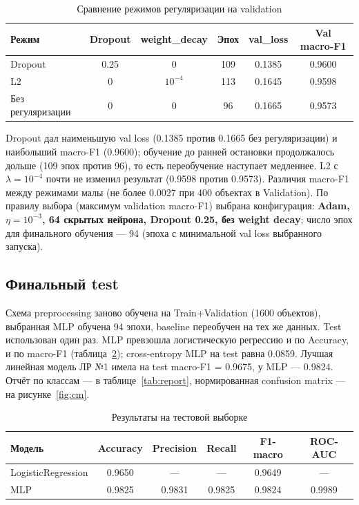 \documentclass[oneside,a4paper,14pt]{extarticle}
\begin{document}
\begin{table}[ht]
\centering
\small
\begin{tabular}{lccccc}
\toprule
Режим & Dropout & weight\_decay & Эпох & val\_loss & Val macro-F1 \\
\midrule
Dropout & 0.25 & 0 & 109 & 0.1385 & 0.9600 \\
L2 & 0 & $10^{-4}$ & 113 & 0.1645 & 0.9598 \\
Без регуляризации & 0 & 0 & 96 & 0.1665 & 0.9573 \\
\bottomrule
\end{tabular}
\caption{Сравнение режимов регуляризации на validation}
\label{tab:reg}
\end{table}

Dropout дал наименьшую val loss (0.1385 против 0.1665 без регуляризации) и наибольший macro-F1 (0.9600); обучение до ранней остановки продолжалось дольше (109 эпох против 96), то есть переобучение наступает медленнее. L2 с $\lambda=10^{-4}$ почти не изменил результат (0.9598 против 0.9573). Различия macro-F1 между режимами малы (не более 0.0027 при 400 объектах в Validation). По правилу выбора (максимум validation macro-F1) выбрана конфигурация: \textbf{Adam, $\eta=10^{-3}$, 64 скрытых нейрона, Dropout 0.25, без weight decay}; число эпох для финального обучения --- 94 (эпоха с минимальной val loss выбранного запуска).

\subsection{Финальный test}
Схема preprocessing заново обучена на Train+Validation (1600 объектов), выбранная MLP обучена 94 эпохи, baseline переобучен на тех же данных. Test использован один раз. MLP превзошла логистическую регрессию и по Accuracy, и по macro-F1 (таблица~\ref{tab:test}); cross-entropy MLP на test равна 0.0859. Лучшая линейная модель ЛР №1 имела на test macro-F1 = 0.9675, у MLP --- 0.9824. Отчёт по классам --- в таблице~\ref{tab:report}, нормированная confusion matrix --- на рисунке~\ref{fig:cm}.

\begin{table}[ht]
\centering
\begin{tabular}{lccccc}
\toprule
Модель & Accuracy & Precision & Recall & F1-macro & ROC-AUC \\
\midrule
LogisticRegression & 0.9650 & --- & --- & 0.9649 & --- \\
MLP & 0.9825 & 0.9831 & 0.9825 & 0.9824 & 0.9989 \\
\bottomrule
\end{tabular}
\caption{Результаты на тестовой выборке}
\label{tab:test}
\end{table}
\end{document}
